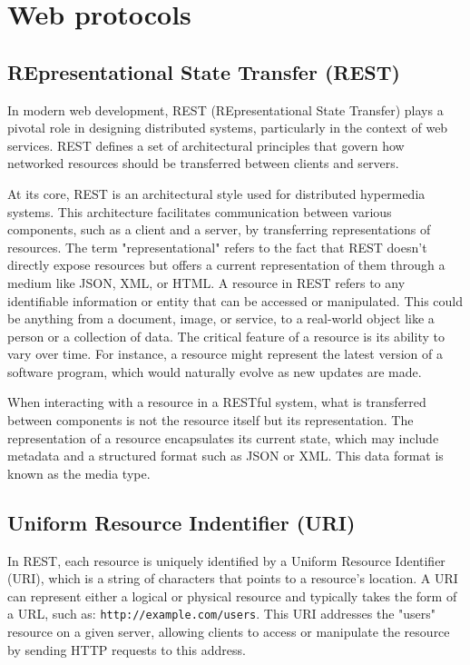 \chapter{Web protocols}
\section{REpresentational State Transfer (REST) }
In modern web development, REST (REpresentational State Transfer) plays a pivotal role in designing distributed systems, particularly in the context of web services. REST defines a set of architectural principles that govern how networked resources should be transferred between clients and servers.

At its core, REST is an architectural style used for distributed hypermedia systems. This architecture facilitates communication between various components, such as a client and a server, by transferring representations of resources. The term "representational" refers to the fact that REST doesn’t directly expose resources but offers a current representation of them through a medium like JSON, XML, or HTML. A resource in REST refers to any identifiable information or entity that can be accessed or manipulated. This could be anything from a document, image, or service, to a real-world object like a person or a collection of data. The critical feature of a resource is its ability to vary over time. For instance, a resource might represent the latest version of a software program, which would naturally evolve as new updates are made. 

When interacting with a resource in a RESTful system, what is transferred between components is not the resource itself but its representation. The representation of a resource encapsulates its current state, which may include metadata and a structured format such as JSON or XML. This data format is known as the media type.

\section{Uniform Resource Indentifier (URI)}
In REST, each resource is uniquely identified by a Uniform Resource Identifier (URI), which is a string of characters that points to a resource's location. A URI can represent either a logical or physical resource and typically takes the form of a URL, such as: \texttt{http://example.com/users}. This URI addresses the "users" resource on a given server, allowing clients to access or manipulate the resource by sending HTTP requests to this address.

